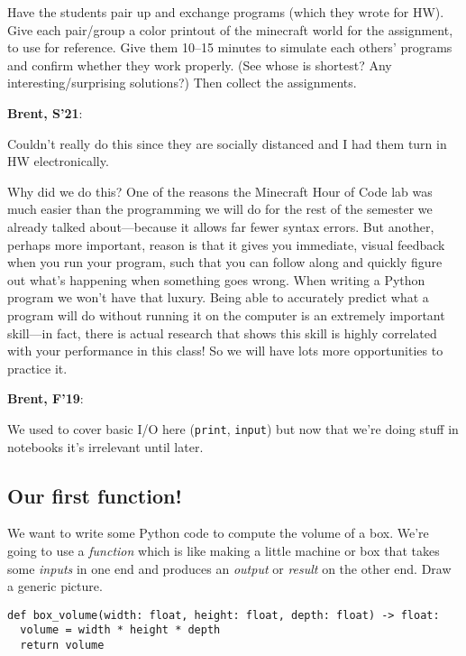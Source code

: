 \documentclass{article}
\newenvironment{reflect}[1]
{
  \noindent
  \begin{lrbox}{\reflectbox}
    \begin{minipage}[t]{\textwidth}
      \textbf{#1}:
}{
    \end{minipage}
  \end{lrbox}
  \fbox{\usebox{\reflectbox}}
}
\begin{document}
Have the students pair up and exchange programs (which they wrote for
HW).  Give each pair/group a color printout of the minecraft world for
the assignment, to use for reference.  Give them 10--15 minutes to
simulate each others' programs and confirm whether they work properly.
(See whose is shortest? Any interesting/surprising solutions?)  Then
collect the assignments.

\begin{reflect}{Brent, S'21}
  Couldn't really do this since they are socially distanced and I had
  them turn in HW electronically.
\end{reflect}

Why did we do this?  One of the reasons the Minecraft Hour of Code lab
was much easier than the programming we will do for the rest of the
semester we already talked about---because it allows far fewer syntax
errors.  But another, perhaps more important, reason is that it gives
you immediate, visual feedback when you run your program, such that
you can follow along and quickly figure out what's happening when
something goes wrong.  When writing a Python program we won't have
that luxury.  Being able to accurately predict what a program will do
without running it on the computer is an extremely important
skill---in fact, there is actual research that shows this skill is
highly correlated with your performance in this class!  So we will
have lots more opportunities to practice it.

\begin{reflect}{Brent, F'19}
  We used to cover basic I/O here (\texttt{print}, \texttt{input}) but
  now that we're doing stuff in notebooks it's irrelevant until later.
\end{reflect}

\subsection*{Our first function!}

We want to write some Python code to compute the volume of a box.
We're going to use a \emph{function} which is like making a little
machine or box that takes some \emph{inputs} in one end and produces
an \emph{output} or \emph{result} on the other end.  Draw a generic
picture.

\begin{verbatim}
def box_volume(width: float, height: float, depth: float) -> float:
  volume = width * height * depth
  return volume
\end{verbatim}
\end{document}
